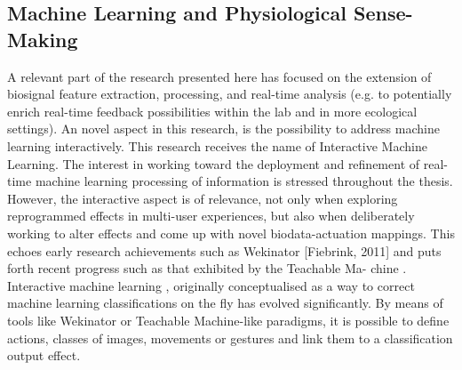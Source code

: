 \subsection{Machine Learning and Physiological Sense-Making}

A relevant part of the research presented here has focused on the extension of biosignal feature extraction, processing, and real-time analysis (e.g. to potentially enrich real-time feedback possibilities within the lab and in more ecological settings).  An novel aspect in this research, is the possibility to address machine learning interactively. This research receives the name of Interactive Machine Learning. The interest in working toward the deployment and refinement of real-time machine learning processing of information is stressed throughout the thesis. However, the interactive aspect is of relevance, not only when exploring reprogrammed effects in multi-user experiences, but also when deliberately working to alter effects and come up with novel biodata-actuation mappings. This echoes early research achievements such as Wekinator \cite{} [Fiebrink, 2011] and puts forth recent progress such as that exhibited by the Teachable Ma- chine \cite{carney_teachable_2020}. Interactive machine learning \cite{fails_interactive_2003}, originally conceptualised as a way to correct machine learning classifications on the fly has evolved significantly. By means of tools like Wekinator or Teachable Machine-like paradigms, it is possible to define actions, classes of images, movements or gestures and link them to a classification output effect. 

